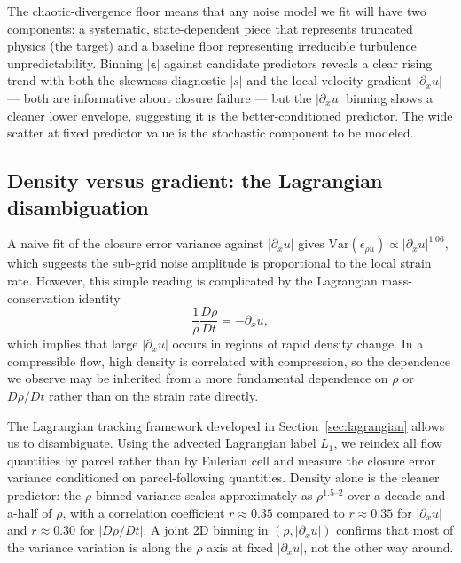 \documentclass[11pt,letterpaper]{article}
\begin{document}
The chaotic-divergence floor means that any noise model we fit will have two components: a systematic, state-dependent piece that represents truncated physics (the target) and a baseline floor representing irreducible turbulence unpredictability. Binning $|\bm{\epsilon}|$ against candidate predictors reveals a clear rising trend with both the skewness diagnostic $|s|$ and the local velocity gradient $|\partial_x u|$ --- both are informative about closure failure --- but the $|\partial_x u|$ binning shows a cleaner lower envelope, suggesting it is the better-conditioned predictor. The wide scatter at fixed predictor value is the stochastic component to be modeled.

\subsection{Density versus gradient: the Lagrangian disambiguation}
\label{sec:kmles:density}

A naive fit of the closure error variance against $|\partial_x u|$ gives $\mathrm{Var}(\epsilon_{\rho u}) \propto |\partial_x u|^{1.06}$, which suggests the sub-grid noise amplitude is proportional to the local strain rate. However, this simple reading is complicated by the Lagrangian mass-conservation identity
\begin{equation}
\frac{1}{\rho} \frac{D\rho}{Dt} = -\partial_x u,
\label{eq:mass_id}
\end{equation}
which implies that large $|\partial_x u|$ occurs in regions of rapid density change. In a compressible flow, high density is correlated with compression, so the dependence we observe may be inherited from a more fundamental dependence on $\rho$ or $D\rho/Dt$ rather than on the strain rate directly.

The Lagrangian tracking framework developed in Section~\ref{sec:lagrangian} allows us to disambiguate. Using the advected Lagrangian label $L_1$, we reindex all flow quantities by parcel rather than by Eulerian cell and measure the closure error variance conditioned on parcel-following quantities. Density alone is the cleaner predictor: the $\rho$-binned variance scales approximately as $\rho^{1.5\text{--}2}$ over a decade-and-a-half of $\rho$, with a correlation coefficient $r \approx 0.35$ compared to $r \approx 0.35$ for $|\partial_x u|$ and $r \approx 0.30$ for $|D\rho/Dt|$. A joint 2D binning in $(\rho, |\partial_x u|)$ confirms that most of the variance variation is along the $\rho$ axis at fixed $|\partial_x u|$, not the other way around.
\end{document}
